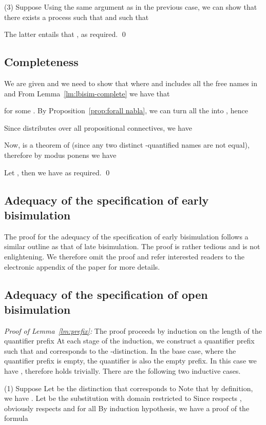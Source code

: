 \documentclass{acmtrans2m}
\begin{document}
\noindent(3) Suppose  Using the same argument as in the previous case,
we can show that there exists a process  such that 
and such that

The latter entails that , as required. \qed



\subsection{Completeness} We are given  and
we need to show that  where 
 and  includes all the free names in
 and  From Lemma~\ref{lm:lbisim-complete} we have that 

for some . By Proposition~\ref{prop:forall nabla},
we can turn all the  into , hence

Since  distributes over all propositional connectives, we have

Now,  is a theorem of  (since any
two distinct -quantified names are not equal), therefore by modus ponens
we have

Let , then we have 
as required.
\qed


\subsection{Adequacy of the specification of early bisimulation}

The proof for the adequacy of the specification of early bisimulation follows a 
similar outline as that of late bisimulation. The proof is rather tedious and is not
enlightening. We therefore omit the proof and refer interested readers to
the electronic appendix of the paper for more details.

\subsection{Adequacy of the specification of open bisimulation}

{\em Proof of Lemma~\ref{lm:prefix}: }
The proof proceeds by induction on the length of the quantifier prefix 
At each stage of the induction, we construct a quantifier prefix 
such that  and  corresponds to
the -distinction.
In the base case, where the quantifier prefix  is empty, the quantifier
 is also the empty prefix. In this case we have
, therefore  holds trivially.
There are the following two inductive cases.

\noindent (1) Suppose 
Let  be the distinction that corresponds to 
Note that by definition, we have
.
Let  be the substitution  with domain restricted to 
Since  respects , obviously  respects  and 
 for all  By induction hypothesis, we have
a proof of the formula
 
\end{document}
